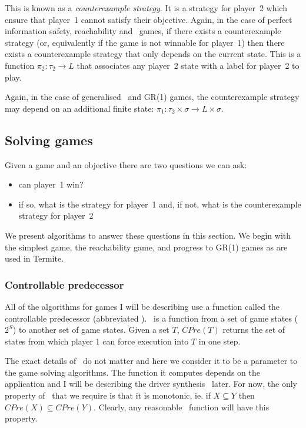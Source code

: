 This is known as a \emph{counterexample strategy}. It is a strategy for player~2 which ensure that player~1 cannot satisfy their objective. Again, in the case of perfect information safety, reachability and \buchi\ games, if there exists a counterexample strategy (or, equivalently if the game is not winnable for player~1) then there exists a counterexample strategy that only depends on the current state. This is a function $\pi_2 : \tau_2 \rightarrow L$ that associates any player~2 state with a label for player~2 to play. 

Again, in the case of generalised \buchi\ and GR(1) games, the counterexample strategy may depend on an additional finite state: $\pi_1 : \tau_2 \times \sigma \rightarrow L \times \sigma$.

\subsection{Solving games}

Given a game and an objective there are two questions we can ask:
\begin{itemize}
    \item can player~1 win?
    \item if so, what is the strategy for player~1 and, if not, what is the counterexample strategy for player~2
\end{itemize}

We present algorithms to answer these questions in this section. We begin with the simplest game, the reachability game, and progress to GR(1) games as are used in Termite.

\subsubsection{Controllable predecessor}

All of the algorithms for games I will be describing use a function called the controllable predecessor (abbreviated \cpre). \cpre\ is a function from a set of game states ($2^S$) to another set of game states. Given a set $T$, $CPre(T)$ returns the set of states from which player 1 can force execution into $T$ in one step. 

The exact details of \cpre\ do not matter and here we consider it to be a parameter to the game solving algorithms. The function it computes depends on the application and I will be describing the driver synthesis \cpre\ later. For now, the only property of \cpre\ that we require is that it is monotonic, ie. if $X \subseteq Y$ then $CPre(X) \subseteq CPre(Y)$. Clearly, any reasonable \cpre\ function will have this property.

